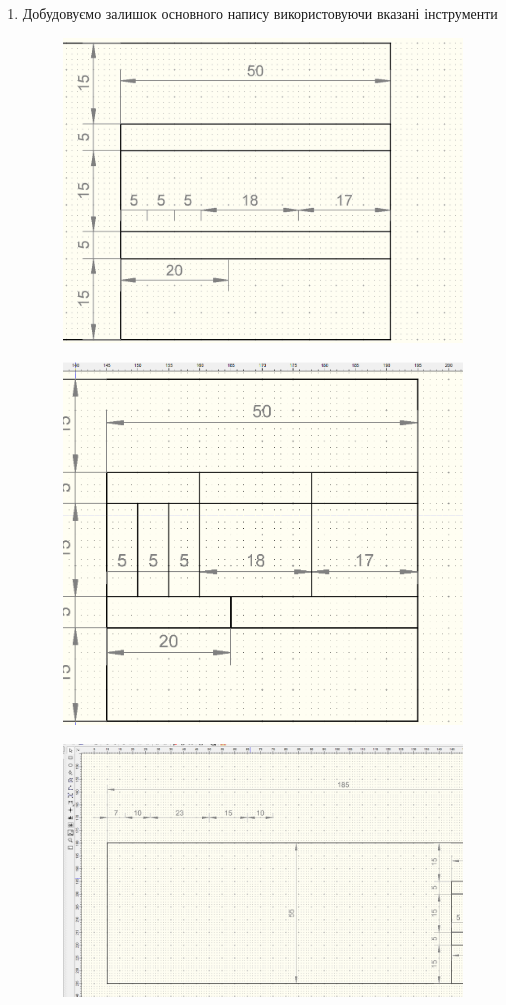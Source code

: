 \begin{enumerate}[leftmargin=*]
\item Добудовуємо залишок основного напису використовуючи вказані інструменти
  \begin{figure}[!htb]
    \centering \includegraphics[width=0.7\linewidth]{./images/lab2/fifth_step.png}
    \caption{ \label{fig:lab2:fifth_step}}
  \end{figure}
  \begin{figure}[!htb]
    \centering \includegraphics[width=0.7\linewidth]{./images/lab2/sixth_step.png}
    \caption{}
    \label{fig:lab2:sixth_step} 
  \end{figure}
  \begin{figure}[!htb]
    \centering \includegraphics[width=0.7\linewidth]{./images/lab2/seventh_step.png}

\end{figure}
\end{enumerate}
